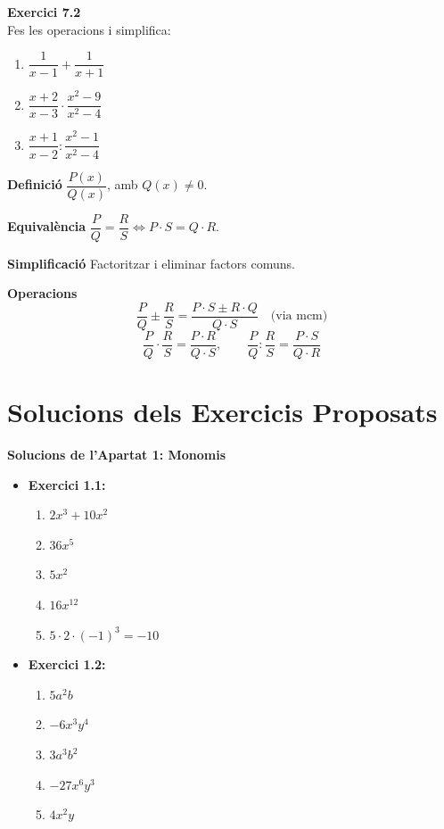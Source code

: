 \documentclass[12pt]{article}
\begin{document}
\begin{exercici}
\textbf{Exercici 7.2}\\
Fes les operacions i simplifica:
\begin{enumerate}[label=\alph*)]
    \item $\dfrac{1}{x-1} + \dfrac{1}{x+1}$
    \item $\dfrac{x+2}{x-3} \cdot \dfrac{x^2-9}{x^2-4}$
    \item $\dfrac{x+1}{x-2} : \dfrac{x^2-1}{x^2-4}$
\end{enumerate}
\end{exercici}

\begin{resum}[title=Resum 7: Fraccions Algebraiques]
\textbf{Definició} $\dfrac{P(x)}{Q(x)}$, amb $Q(x) \neq 0$.

\textbf{Equivalència} $\dfrac{P}{Q} = \dfrac{R}{S} \iff P \cdot S = Q \cdot R$.

\textbf{Simplificació} Factoritzar i eliminar factors comuns.

\textbf{Operacions}
\[
\dfrac{P}{Q} \pm \dfrac{R}{S} = \dfrac{P \cdot S \pm R \cdot Q}{Q \cdot S} \quad \text{(via mcm)}
\]
\[
\dfrac{P}{Q} \cdot \dfrac{R}{S} = \dfrac{P \cdot R}{Q \cdot S}, \qquad
\dfrac{P}{Q} : \dfrac{R}{S} = \dfrac{P \cdot S}{Q \cdot R}
\]
\end{resum}

\newpage

\appendix
\section{Solucions dels Exercicis Proposats}

\begin{solucio}
\textbf{Solucions de l'Apartat 1: Monomis}
\begin{itemize}
    \item \textbf{Exercici 1.1:}
    \begin{enumerate}[label=\alph*)]
        \item $2x^3 + 10x^2$
        \item $36x^5$
        \item $5x^2$
        \item $16x^{12}$
        \item $5 \cdot 2 \cdot (-1)^3 = -10$
    \end{enumerate}
    \item \textbf{Exercici 1.2:}
    \begin{enumerate}[label=\alph*)]
        \item $5a^2 b$
        \item $-6x^3 y^4$
        \item $3a^3 b^2$
        \item $-27x^6 y^3$
        \item $4x^2 y$
    \end{enumerate}
\end{itemize}
\end{solucio}
\end{document}
